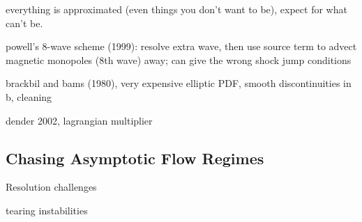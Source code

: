 everything is approximated (even things you don't want to be), expect for what can't be.

powell's 8-wave scheme (1999): resolve extra wave, then use source term to advect magnetic monopoles (8th wave) away; can give the wrong shock jump conditions

brackbil and bams (1980), very expensive elliptic PDF, smooth discontinuities in b, cleaning

dender 2002, lagrangian multiplier

\subsection{Chasing Asymptotic Flow Regimes}

Resolution challenges

tearing instabilities
